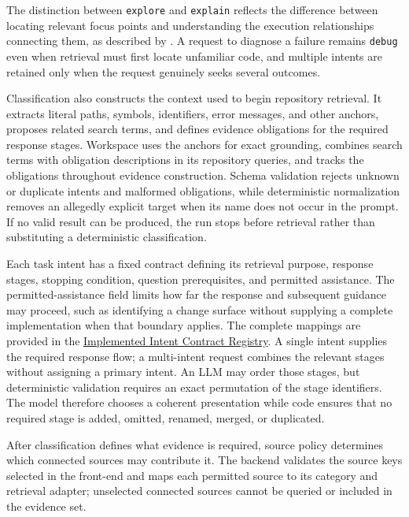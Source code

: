 The distinction between \texttt{explore} and \texttt{explain} reflects the difference between locating relevant focus points and understanding the execution relationships connecting them, as described by \textcite{Sillito2008ProgrammingQuestions}. A request to diagnose a failure remains \texttt{debug} even when retrieval must first locate unfamiliar code, and multiple intents are retained only when the request genuinely seeks several outcomes.

Classification also constructs the context used to begin repository retrieval. It extracts literal paths, symbols, identifiers, error messages, and other anchors, proposes related search terms, and defines evidence obligations for the required response stages. Workspace uses the anchors for exact grounding, combines search terms with obligation descriptions in its repository queries, and tracks the obligations throughout evidence construction. Schema validation rejects unknown or duplicate intents and malformed obligations, while deterministic normalization removes an allegedly explicit target when its name does not occur in the prompt. If no valid result can be produced, the run stops before retrieval rather than substituting a deterministic classification.

Each task intent has a fixed contract defining its retrieval purpose, response stages, stopping condition, question prerequisites, and permitted assistance. The permitted-assistance field limits how far the response and subsequent guidance may proceed, such as identifying a change surface without supplying a complete implementation when that boundary applies. The complete mappings are provided in the \hyperref[ch:implemented-intent-contract-registry]{Implemented Intent Contract Registry}. A single intent supplies the required response flow; a multi-intent request combines the relevant stages without assigning a primary intent. An LLM may order those stages, but deterministic validation requires an exact permutation of the stage identifiers. The model therefore chooses a coherent presentation while code ensures that no required stage is added, omitted, renamed, merged, or duplicated.

After classification defines what evidence is required, source policy determines which connected sources may contribute it. The backend validates the source keys selected in the front-end and maps each permitted source to its category and retrieval adapter; unselected connected sources cannot be queried or included in the evidence set.

